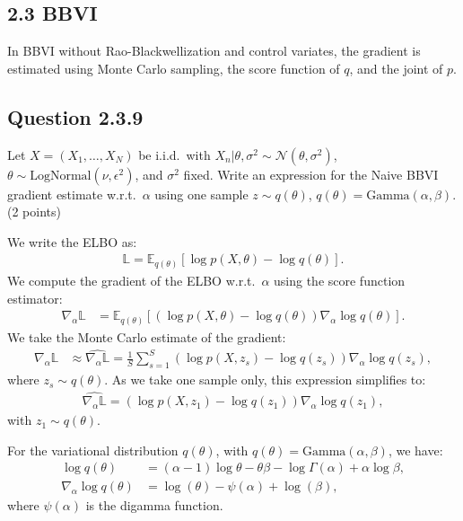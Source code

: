 \documentclass{article}
\begin{document}
\begin{multicols}{2}
\section*{2.3 BBVI}
In BBVI without Rao-Blackwellization and control variates, the gradient is estimated using Monte Carlo sampling, the score function of \(q\), and the joint of \(p\).

\subsection*{Question 2.3.9}
Let \(X = (X_1, \dots, X_N)\) be i.i.d.\ with \(X_n | \theta, \sigma^2 \sim \mathcal{N}(\theta, \sigma^2)\), \(\theta \sim \text{LogNormal}(\nu, \epsilon^2)\), and \(\sigma^2\) fixed. Write an expression for the Naive BBVI gradient estimate w.r.t.\ \(\alpha\) using one sample \(z \sim q(\theta)\), \(q(\theta) = \text{Gamma}(\alpha, \beta)\). (2 points)\bigskip 

We write the ELBO as:
\begin{align*}
    \mathbb{L} = \mathbb{E}_{q(\theta)}\left[\log p(X, \theta) - \log q(\theta)\right].
\end{align*}
We compute the gradient of the ELBO w.r.t.\ \(\alpha\) using the score function estimator:
\begin{align*}
    \nabla_\alpha \mathbb{L} &= \mathbb{E}_{q(\theta)}\left[(\log p(X, \theta) - \log q(\theta)) \nabla_\alpha \log q(\theta) \right].
\end{align*}
We take the Monte Carlo estimate of the gradient:
\begin{align*}
    \nabla_\alpha \mathbb{L} &\approx \widehat{\nabla_\alpha \mathbb{L}} = \frac{1}{S}\sum_{s=1}^{S}(\log p(X, z_s) - \log q(z_s)) \nabla_\alpha \log q(z_s),
\end{align*}
where \(z_s \sim q(\theta)\). As we take one sample only, this expression simplifies to:
\begin{align*}
    \widehat{\nabla_\alpha \mathbb{L}} = (\log p(X, z_1) - \log q(z_1)) \nabla_\alpha \log q(z_1),
\end{align*}
with \(z_1 \sim q(\theta)\).

For the variational distribution \(q(\theta)\), with \(q(\theta) = \text{Gamma}(\alpha, \beta)\), we have:
\begin{align*}
    \log q(\theta) &= (\alpha - 1)\log \theta - \theta \beta - \log \Gamma(\alpha) + \alpha \log \beta, \\
    \nabla_\alpha \log q(\theta) &= \log(\theta) - \psi(\alpha) + \log(\beta),
\end{align*}
where \(\psi(\alpha)\) is the digamma function.


\end{multicols}
\end{document}
